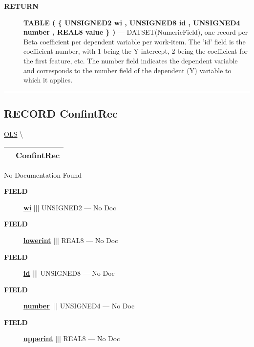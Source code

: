 \par
\begin{description}
\item [\colorbox{tagtype}{\color{white} \textbf{\textsf{RETURN}}}] \textbf{TABLE ( \{ UNSIGNED2 wi , UNSIGNED8 id , UNSIGNED4 number , REAL8 value \} )} --- DATSET(NumericField), one record per Beta coefficient per dependent variable per work-item. The 'id' field is the coefficient number, with 1 being the Y intercept, 2 being the coefficient for the first feature, etc. The number field indicates the dependent variable and corresponds to the number field of the dependent (Y) variable to which it applies.
\end{description}




\rule{\linewidth}{0.5pt}
\subsection*{\textsf{\colorbox{headtoc}{\color{white} RECORD}
ConfintRec}}

\hypertarget{ecldoc:linearregression.ols.confintrec}{}
\hspace{0pt} \hyperlink{ecldoc:linearregression.ols}{OLS} \textbackslash 

{\renewcommand{\arraystretch}{1.5}
\begin{tabularx}{\textwidth}{|>{\raggedright\arraybackslash}l|X|}
\hline
\hspace{0pt}\mytexttt{\color{red} } & \textbf{ConfintRec} \\
\hline
\end{tabularx}
}

\par





No Documentation Found







\par
\begin{description}
\item [\colorbox{tagtype}{\color{white} \textbf{\textsf{FIELD}}}] \textbf{\underline{wi}} ||| UNSIGNED2 --- No Doc
\item [\colorbox{tagtype}{\color{white} \textbf{\textsf{FIELD}}}] \textbf{\underline{lowerint}} ||| REAL8 --- No Doc
\item [\colorbox{tagtype}{\color{white} \textbf{\textsf{FIELD}}}] \textbf{\underline{id}} ||| UNSIGNED8 --- No Doc
\item [\colorbox{tagtype}{\color{white} \textbf{\textsf{FIELD}}}] \textbf{\underline{number}} ||| UNSIGNED4 --- No Doc
\item [\colorbox{tagtype}{\color{white} \textbf{\textsf{FIELD}}}] \textbf{\underline{upperint}} ||| REAL8 --- No Doc
\end{description}





